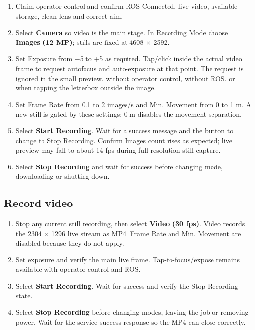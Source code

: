 \documentclass[
  10pt,
  letterpaper,
  openany]{report}
\providecommand{\tightlist}{%
  \setlength{\itemsep}{0pt}\setlength{\parskip}{0pt}}
\begin{document}
\begin{enumerate}
\tightlist
\item
  Claim operator control and confirm ROS Connected, live video,
  available storage, clean lens and correct aim.
\item
  Select \textbf{Camera} so video is the main stage. In Recording Mode
  choose \textbf{Images (12 MP)}; stills are fixed at 4608 × 2592.
\item
  Set Exposure from −5 to +5 as required. Tap/click inside the actual
  video frame to request autofocus and auto-exposure at that point. The
  request is ignored in the small preview, without operator control,
  without ROS, or when tapping the letterbox outside the image.
\item
  Set Frame Rate from 0.1 to 2 images/s and Min. Movement from 0 to 1 m.
  A new still is gated by these settings; 0 m disables the movement
  separation.
\item
  Select \textbf{Start Recording}. Wait for a success message and the
  button to change to Stop Recording. Confirm Images count rises as
  expected; live preview may fall to about 14 fps during full-resolution
  still capture.
\item
  Select \textbf{Stop Recording} and wait for success before changing
  mode, downloading or shutting down.
\end{enumerate}

\subsection{Record video}\label{record-video}

\begin{enumerate}
\tightlist
\item
  Stop any current still recording, then select \textbf{Video (30 fps)}.
  Video records the 2304 × 1296 live stream as MP4; Frame Rate and Min.
  Movement are disabled because they do not apply.
\item
  Set exposure and verify the main live frame. Tap-to-focus/expose
  remains available with operator control and ROS.
\item
  Select \textbf{Start Recording}. Wait for success and verify the Stop
  Recording state.
\item
  Select \textbf{Stop Recording} before changing modes, leaving the job
  or removing power. Wait for the service success response so the MP4
  can close correctly.
\end{enumerate}
\end{document}
